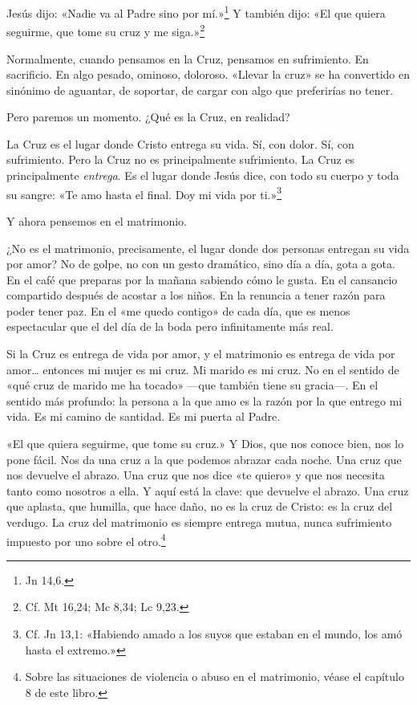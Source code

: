 Jesús dijo: «Nadie va al Padre sino por mí.»\footnote{Jn 14,6.} Y también dijo: «El que quiera seguirme, que tome su cruz y me siga.»\footnote{Cf. Mt 16,24; Mc 8,34; Lc 9,23.}

Normalmente, cuando pensamos en la Cruz, pensamos en sufrimiento. En sacrificio. En algo pesado, ominoso, doloroso. «Llevar la cruz» se ha convertido en sinónimo de aguantar, de soportar, de cargar con algo que preferirías no tener.

Pero paremos un momento. ¿Qué es la Cruz, en realidad?

La Cruz es el lugar donde Cristo entrega su vida. Sí, con dolor. Sí, con sufrimiento. Pero la Cruz no es principalmente sufrimiento. La Cruz es principalmente \emph{entrega}. Es el lugar donde Jesús dice, con todo su cuerpo y toda su sangre: «Te amo hasta el final. Doy mi vida por ti.»\footnote{Cf. Jn 13,1: «Habiendo amado a los suyos que estaban en el mundo, los amó hasta el extremo.»}

Y ahora pensemos en el matrimonio.

¿No es el matrimonio, precisamente, el lugar donde dos personas entregan su vida por amor? No de golpe, no con un gesto dramático, sino día a día, gota a gota. En el café que preparas por la mañana sabiendo cómo le gusta. En el cansancio compartido después de acostar a los niños. En la renuncia a tener razón para poder tener paz. En el «me quedo contigo» de cada día, que es menos espectacular que el del día de la boda pero infinitamente más real.

Si la Cruz es entrega de vida por amor, y el matrimonio es entrega de vida por amor\ldots{} entonces mi mujer es mi cruz. Mi marido es mi cruz. No en el sentido de «qué cruz de marido me ha tocado» ---que también tiene su gracia---. En el sentido más profundo: la persona a la que amo es la razón por la que entrego mi vida. Es mi camino de santidad. Es mi puerta al Padre.

«El que quiera seguirme, que tome su cruz.» Y Dios, que nos conoce bien, nos lo pone fácil. Nos da una cruz a la que podemos abrazar cada noche. Una cruz que nos devuelve el abrazo. Una cruz que nos dice «te quiero» y que nos necesita tanto como nosotros a ella. Y aquí está la clave: que devuelve el abrazo. Una cruz que aplasta, que humilla, que hace daño, no es la cruz de Cristo: es la cruz del verdugo. La cruz del matrimonio es siempre entrega mutua, nunca sufrimiento impuesto por uno sobre el otro.\footnote{Sobre las situaciones de violencia o abuso en el matrimonio, véase el capítulo 8 de este libro.}

